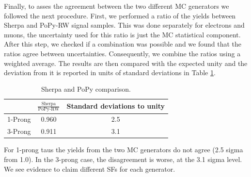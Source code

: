 Finally, to asses the agreement between the two different MC generators we followed the next procedure. First, we performed a ratio of the yields between Sherpa and PoPy-RW signal samples. This was done separately for electrons and muons, the uncertainty used for this ratio is just the MC statistical component. After this step, we checked if a combination was possible and we found that the ratios agree between uncertainties. Consequently, we combine the ratios using a weighted average. The results are then compared with the expected unity and the deviation from it is reported in units of standard deviations in Table \ref{Tab10}.
\begin{table}[]
	\centering
	\begin{tabular}{|c|c|c|}
		\hline
		& $\frac{\text{Sherpa}}{\text{PoPy-RW}}$ & Standard deviations to unity  \\ \hline
		1-Prong & 0.960                                        & 2.5       \\ \hline
		3-Prong & 0.911                                         & 3.1       \\ \hline
	\end{tabular}
	\caption{Sherpa and PoPy comparison.}
	\label{Tab10}
\end{table}		  
For 1-prong taus the yields from the two MC generators do not agree (2.5 sigma from 1.0). In the 3-prong case, the disagreement is worse, at the 3.1 sigma level. We see evidence to claim different SFs for each generator.

